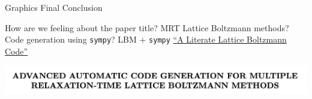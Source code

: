 \begin{frame}{Graphics Final Conclusion}
  \begin{outline}
    \1 How are we feeling about the paper title?
    \2 MRT Lattice Boltzmann methods?
    \2 Code generation using \lstinline{sympy}?
    \1 LBM + \lstinline{sympy}
      \2 \href{http://literatelb.org}{``A Literate Lattice Boltzmann Code''}\cite{web:literate_lbm}
  \end{outline}
  \begin{center}
    \includegraphics[width=0.8\linewidth]{title_header.png}
  \end{center}
\end{frame}
